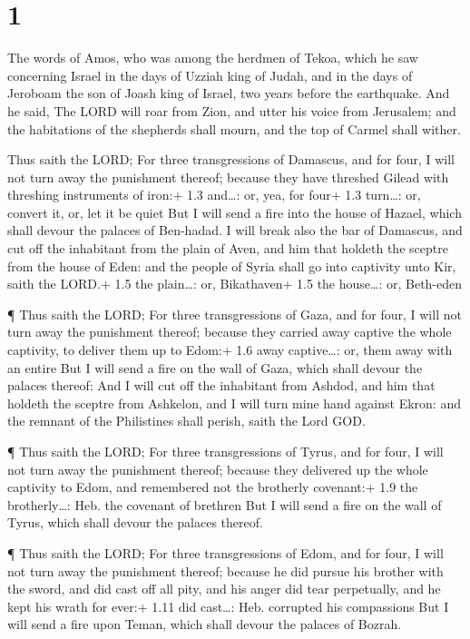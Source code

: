 \hypertarget{section}{%
\section{1}\label{section}}

 The words of Amos, who was among the herdmen of Tekoa,
which he saw concerning Israel in the days of Uzziah king of Judah, and
in the days of Jeroboam the son of Joash king of Israel, two years
before the earthquake.  And he said, The LORD will roar from
Zion, and utter his voice from Jerusalem; and the habitations of the
shepherds shall mourn, and the top of Carmel shall wither.

 Thus saith the LORD; For three transgressions of Damascus,
and for four, I will not turn away the punishment thereof; because they
have threshed Gilead with threshing instruments of iron:+ 1.3 and\ldots:
or, yea, for four+ 1.3 turn\ldots: or, convert it, or, let it be quiet
 But I will send a fire into the house of Hazael, which
shall devour the palaces of Ben-hadad.  I will break also
the bar of Damascus, and cut off the inhabitant from the plain of Aven,
and him that holdeth the sceptre from the house of Eden: and the people
of Syria shall go into captivity unto Kir, saith the LORD.+ 1.5 the
plain\ldots: or, Bikathaven+ 1.5 the house\ldots: or, Beth-eden

 ¶ Thus saith the LORD; For three transgressions of Gaza,
and for four, I will not turn away the punishment thereof; because they
carried away captive the whole captivity, to deliver them up to Edom:+
1.6 away captive\ldots: or, them away with an entire  But I
will send a fire on the wall of Gaza, which shall devour the palaces
thereof:  And I will cut off the inhabitant from Ashdod, and
him that holdeth the sceptre from Ashkelon, and I will turn mine hand
against Ekron: and the remnant of the Philistines shall perish, saith
the Lord GOD.

 ¶ Thus saith the LORD; For three transgressions of Tyrus,
and for four, I will not turn away the punishment thereof; because they
delivered up the whole captivity to Edom, and remembered not the
brotherly covenant:+ 1.9 the brotherly\ldots: Heb. the covenant of
brethren  But I will send a fire on the wall of Tyrus,
which shall devour the palaces thereof.

 ¶ Thus saith the LORD; For three transgressions of Edom,
and for four, I will not turn away the punishment thereof; because he
did pursue his brother with the sword, and did cast off all pity, and
his anger did tear perpetually, and he kept his wrath for ever:+ 1.11
did cast\ldots: Heb. corrupted his compassions  But I will
send a fire upon Teman, which shall devour the palaces of Bozrah.

